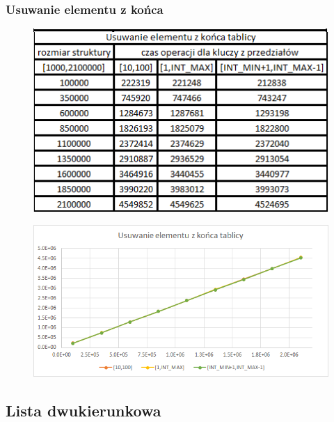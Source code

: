\documentclass{article}
\begin{document}
\newpage

\subsubsection*{Usuwanie elementu z końca}

\begin{figure}[h!]
    \centering
    \includegraphics{images/usuwanie_koniec.png}
\end{figure}

\begin{figure}[h!]
    \centering
    \includegraphics[width=11.3cm]{images/usuwanie_koniec_tab.png}
\end{figure}

\newpage

\subsection{Lista dwukierunkowa}
\end{document}
